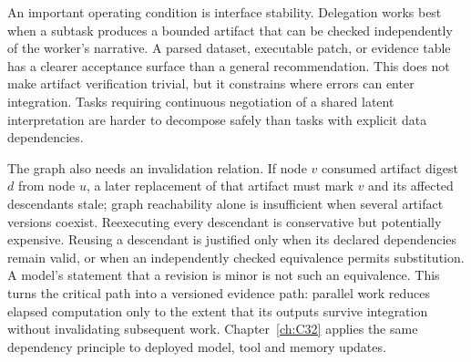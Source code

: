 An important operating condition is interface stability. Delegation works best when a subtask produces a bounded artifact that can be checked independently of the worker's narrative. A parsed dataset, executable patch, or evidence table has a clearer acceptance surface than a general recommendation. This does not make artifact verification trivial, but it constrains where errors can enter integration. Tasks requiring continuous negotiation of a shared latent interpretation are harder to decompose safely than tasks with explicit data dependencies.

The graph also needs an invalidation relation. If node $v$ consumed artifact digest $d$ from node $u$, a later replacement of that artifact must mark $v$ and its affected descendants stale; graph reachability alone is insufficient when several artifact versions coexist. Reexecuting every descendant is conservative but potentially expensive. Reusing a descendant is justified only when its declared dependencies remain valid, or when an independently checked equivalence permits substitution. A model's statement that a revision is minor is not such an equivalence. This turns the critical path into a versioned evidence path: parallel work reduces elapsed computation only to the extent that its outputs survive integration without invalidating subsequent work. Chapter~\ref{ch:C32} applies the same dependency principle to deployed model, tool and memory updates.

